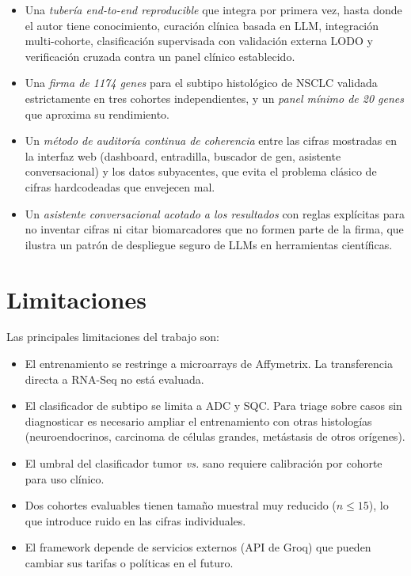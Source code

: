 \begin{itemize}
  \item Una \emph{tubería end-to-end reproducible} que integra por primera
  vez, hasta donde el autor tiene conocimiento, curación clínica basada
  en LLM, integración multi-cohorte, clasificación supervisada con
  validación externa LODO y verificación cruzada contra un panel clínico
  establecido.
  \item Una \emph{firma de 1174 genes} para el subtipo histológico de
  NSCLC validada estrictamente en tres cohortes independientes, y un
  \emph{panel mínimo de 20 genes} que aproxima su rendimiento.
  \item Un \emph{método de auditoría continua de coherencia} entre las
  cifras mostradas en la interfaz web (dashboard, entradilla, buscador de
  gen, asistente conversacional) y los datos subyacentes, que evita el
  problema clásico de cifras hardcodeadas que envejecen mal.
  \item Un \emph{asistente conversacional acotado a los resultados} con
  reglas explícitas para no inventar cifras ni citar biomarcadores que
  no formen parte de la firma, que ilustra un patrón de despliegue seguro
  de LLMs en herramientas científicas.
\end{itemize}

\section{Limitaciones}
\label{sec:conc_limitaciones}

Las principales limitaciones del trabajo son:

\begin{itemize}
  \item El entrenamiento se restringe a microarrays de Affymetrix. La
  transferencia directa a RNA-Seq no está evaluada.
  \item El clasificador de subtipo se limita a ADC y SQC. Para triage
  sobre casos sin diagnosticar es necesario ampliar el entrenamiento con
  otras histologías (neuroendocrinos, carcinoma de células grandes,
  metástasis de otros orígenes).
  \item El umbral del clasificador tumor \emph{vs.} sano requiere
  calibración por cohorte para uso clínico.
  \item Dos cohortes evaluables tienen tamaño muestral muy reducido
  ($n \leq 15$), lo que introduce ruido en las cifras individuales.
  \item El framework depende de servicios externos (API de Groq) que
  pueden cambiar sus tarifas o políticas en el futuro.
\end{itemize}

